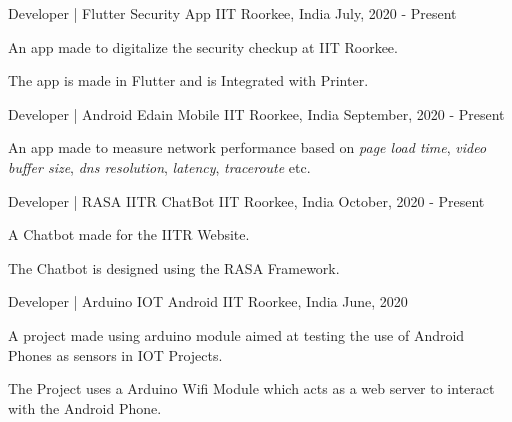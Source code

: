 

\begin{cventries}

  \cventry
    {Developer | Flutter} %
    {Security App} %
    {IIT Roorkee, India} %
    {July, 2020 - Present} %
    {
      \begin{cvitems} %
        \item {An app made to digitalize the security checkup at IIT Roorkee.}
        \item {The app is made in Flutter and is Integrated with Printer.}
      \end{cvitems}
    }

  \cventry
    {Developer | Android} %
    {Edain Mobile} %
    {IIT Roorkee, India} %
    {September, 2020 - Present} %
    {
      \begin{cvitems} %
        \item {An app made to measure network performance based on \textit{page load time}, \textit{video buffer size},
        \textit{dns resolution}, \textit{latency}, \textit{traceroute} etc.}
      \end{cvitems}
    }

  \cventry
    {Developer | RASA} %
    {IITR ChatBot} %
    {IIT Roorkee, India} %
    {October, 2020 - Present} %
    {
      \begin{cvitems} %
        \item {A Chatbot made for the IITR Website.}
        \item {The Chatbot is designed using the RASA Framework.}
      \end{cvitems}
    }

  \cventry
    {Developer | Arduino} %
    {IOT Android} %
    {IIT Roorkee, India} %
    {June, 2020} %
    {
      \begin{cvitems} %
        \item {A project made using arduino module aimed at testing the use of Android Phones as sensors in IOT Projects.}
        \item {The Project uses a Arduino Wifi Module which acts as a web server to interact with the Android Phone.}
      \end{cvitems}
    }

\end{cventries}